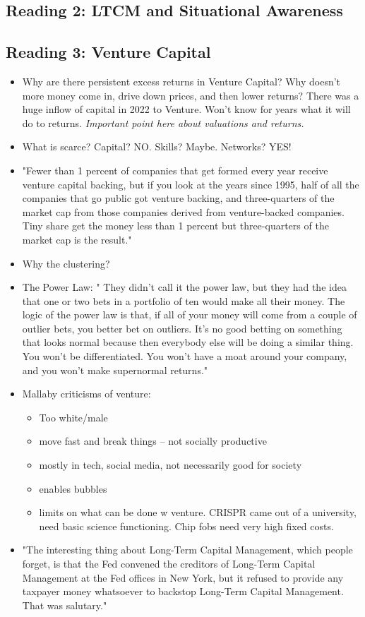 \documentclass[11pt]{article}
\theoremstyle{definition}
\begin{document}
\begin{itemize}
\end{itemize}


\subsection{Reading 2: LTCM and Situational Awareness}

\subsection{Reading 3: Venture Capital}

\begin{itemize}
\item Why are there persistent excess returns in Venture Capital?   Why doesn't more money come in, drive down prices, and then lower returns?   There was a huge inflow of capital in 2022 to Venture.   Won't know for years what it will do to returns.   \textit{Important point here about valuations and returns.}  
\item What is scarce?   Capital?  NO.   Skills?  Maybe.   Networks?   YES!
\item "Fewer than 1 percent of companies that get formed every year receive venture capital backing, but if you look at the years since 1995, half of all the companies that go public got venture backing, and three-quarters of the market cap from those companies derived from venture-backed companies. Tiny share get the money less than 1 percent but three-quarters of the market cap is the result."
\item Why the clustering?
\item The Power Law: " They didn’t call it the power law, but they had the idea that one or two bets in a portfolio of ten would make all their money.  The logic of the power law is that, if all of your money will come from a couple of outlier bets, you better bet on outliers. It’s no good betting on something that looks normal because then everybody else will be doing a similar thing. You won’t be differentiated. You won’t have a moat around your company, and you won’t make supernormal returns."
\item Mallaby criticisms of venture:
\begin{itemize}
    \item Too white/male
    \item move fast and break things -- not socially productive
    \item mostly in tech, social media, not necessarily good for society
    \item enables bubbles 
    \item limits on what can be done w venture.  CRISPR came out of a university, need basic science functioning.   Chip fobs need very high fixed costs.
\end{itemize}
\item "The interesting thing about Long-Term Capital Management, which people forget, is that the Fed convened the creditors of Long-Term Capital Management at the Fed offices in New York, but it refused to provide any taxpayer money whatsoever to backstop Long-Term Capital Management. That was salutary."
\end{itemize}
\end{document}
